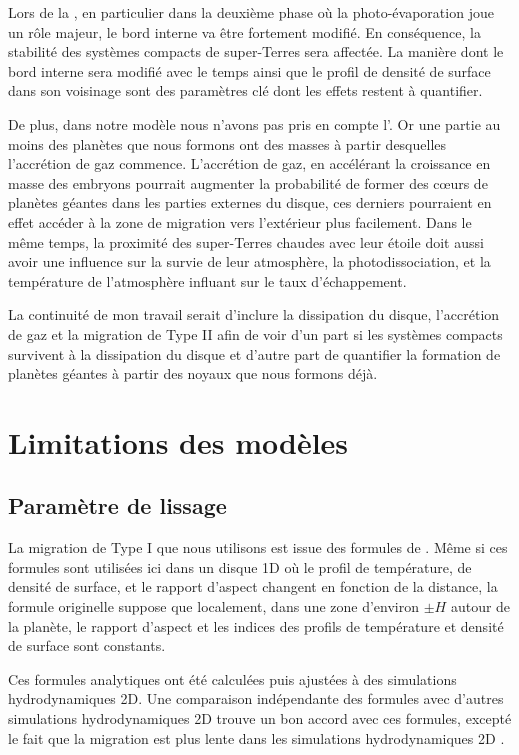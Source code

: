 \bigskip

Lors de la , en particulier dans la deuxième phase où la photo-évaporation joue un rôle majeur, le bord interne va être fortement modifié. En conséquence, la stabilité des systèmes compacts de super-Terres sera affectée. La manière dont le bord interne sera modifié avec le temps ainsi que le profil de densité de surface dans son voisinage sont des paramètres clé dont les effets restent à quantifier. 

De plus, dans notre modèle nous n'avons pas pris en compte l'. Or une partie au moins des planètes que nous
formons ont des masses à partir desquelles l'accrétion de gaz commence. L'accrétion de gaz, en accélérant la croissance en
masse des embryons pourrait augmenter la probabilité de former des cœurs de planètes géantes dans les parties externes du
disque, ces derniers pourraient en effet accéder à la zone de migration vers l'extérieur plus facilement. Dans le même temps, la
proximité des super-Terres chaudes avec leur étoile doit aussi avoir une influence sur la survie de leur atmosphère, la photodissociation, et la température de l'atmosphère influant sur le taux d'échappement. 

La continuité de mon travail serait d'inclure la dissipation du disque, l'accrétion de gaz et la migration de Type II afin de voir d'un part si les systèmes compacts survivent à la dissipation du disque et d'autre part de quantifier la formation de planètes géantes à partir des noyaux que nous formons déjà.

\section{Limitations des modèles}
\subsection{Paramètre de lissage}
La migration de Type I que nous utilisons est issue des formules de \cite{paardekooper2011torque}. Même si ces formules sont utilisées ici dans un disque 1D où le profil de température, de densité de surface, et le rapport d'aspect changent en fonction de la distance, la formule originelle suppose que localement, dans une zone d'environ $\pm H$ autour de la planète, le rapport d'aspect et les indices des profils de température et densité de surface sont constants. 

Ces formules analytiques ont été calculées puis ajustées à des simulations hydrodynamiques 2D. Une comparaison indépendante des formules avec d'autres simulations hydrodynamiques 2D trouve un bon accord avec ces formules, excepté le fait que la migration est plus lente dans les simulations hydrodynamiques 2D \citep{pierens2013makingaccepted}. 

